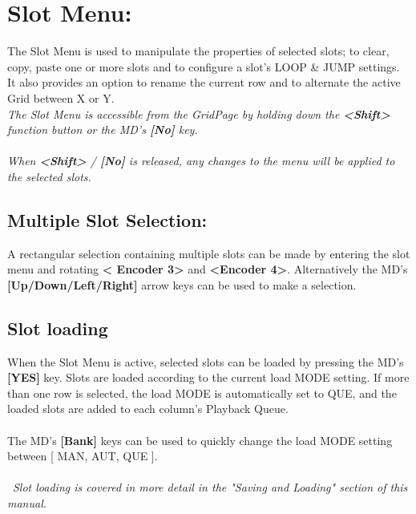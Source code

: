 \chapter{Slot Menu:}

The Slot Menu is used to manipulate the properties of selected slots; to clear, copy, paste one or more slots and to configure a slot's LOOP \& JUMP settings. It also provides an option to rename the current row and to alternate the active Grid between X or Y.
\\
\textit{The Slot Menu is accessible from the GridPage by holding down the \textbf{<Shift>} function button or the MD's \textbf{[No]} key.\\\\When \textbf{<Shift>} / \textbf{[No]} is released, any changes to the menu will be applied to the selected slots. }
\section{Multiple Slot Selection:}
A rectangular selection containing multiple slots can be made by entering the slot menu and rotating \textbf{< Encoder 3>} and \textbf{<Encoder 4>}. Alternatively the MD's \textbf{[Up/Down/Left/Right]} arrow keys can be used to make a selection.
\section{Slot loading}
When the Slot Menu is active, selected slots can be loaded by pressing the MD's \textbf{[YES]} key. 
Slots are loaded according to the current load MODE setting. If more than one row is selected, the load MODE is automatically set to QUE, and the loaded slots are added to each column's Playback Queue.
\\\\
The MD's \textbf{[Bank]} keys can be used to quickly change the load MODE setting between [ MAN, AUT, QUE ].
\\\\\
\textit{Slot loading is covered in more detail in the "Saving and Loading" section of this manual.}
\newpage
